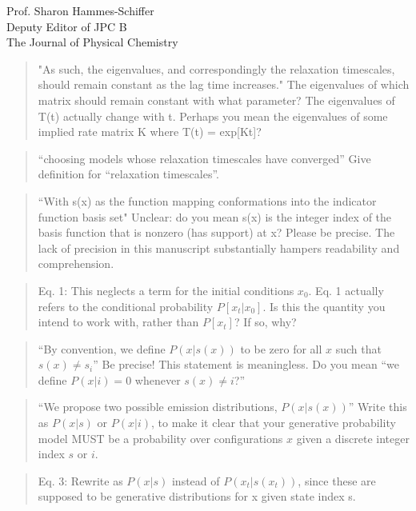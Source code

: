 \documentclass{letter}
\begin{document}
\begin{letter}{Prof. Sharon Hammes-Schiffer \\ Deputy Editor of JPC B \\ The Journal of Physical Chemistry}
\begin{quote}
"As such, the eigenvalues, and correspondingly the relaxation timescales, should remain constant as the lag time increases."  The eigenvalues of which matrix should remain constant with what parameter?  The eigenvalues of T(t) actually change with t.  Perhaps you mean the eigenvalues of some implied rate matrix K where T(t) = exp[Kt]?
\end{quote}

\begin{quote}
``choosing models whose relaxation timescales have converged''  Give definition for ``relaxation timescales''.
\end{quote}

\begin{quote}
``With s(x) as the function mapping conformations into the indicator function basis set" Unclear: do you mean s(x) is the integer index of the basis function that is nonzero (has support) at x?  Please be precise.  The lack of precision in this manuscript substantially hampers readability and comprehension.
\end{quote}

\begin{quote}
Eq. 1: This neglects a term for the initial conditions $x_0$.  Eq. 1 actually refers to the conditional probability $P[{x_t}|x_0]$.  Is this the quantity you intend to work with, rather than $P[{x_t}]$?  If so, why?
\end{quote}

\begin{quote}
``By convention, we define $P(x | s(x))$ to be zero for all $x$ such that $s(x) \ne s_i$'' Be precise!  This statement is meaningless.  Do you mean ``we define $P(x | i) = 0$ whenever $s(x)\ne i$?''
\end{quote}

\begin{quote}
``We propose two possible emission distributions, $P(x | s(x))$''  Write this as $P(x | s)$ or $P(x | i)$, to make it clear that your generative probability model MUST be a probability over configurations $x$ given a discrete integer index $s$ or $i$.
\end{quote}

\begin{quote}
Eq. 3: Rewrite as $P(x|s)$ instead of $P(x_t|s(x_t))$, since these are supposed to be generative distributions for x given state index s.
\end{quote}


\end{letter}
\end{document}
